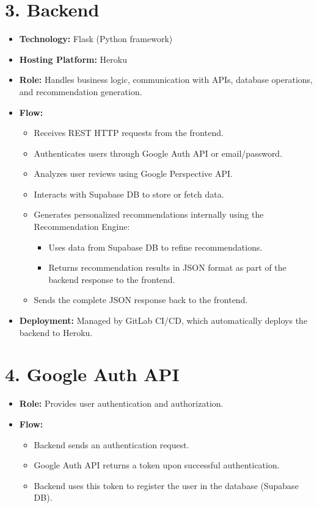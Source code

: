 \documentclass[a4paper,12pt]{article}
\begin{document}
\section*{3. Backend}
\begin{itemize}[leftmargin=*]
  \item \textbf{Technology:} Flask (Python framework)
  \item \textbf{Hosting Platform:} Heroku
  \item \textbf{Role:} Handles business logic, communication with APIs, database operations, and recommendation generation.
  \item \textbf{Flow:}
    \begin{itemize}
        \item Receives REST HTTP requests from the frontend.
        \item Authenticates users through Google Auth API or email/password.
        \item Analyzes user reviews using Google Perspective API.
        \item Interacts with Supabase DB to store or fetch data.
        \item Generates personalized recommendations internally using the Recommendation Engine:
        \begin{itemize}
            \item Uses data from Supabase DB to refine recommendations.
            \item Returns recommendation results in JSON format as part of the backend response to the frontend.
        \end{itemize}
        \item Sends the complete JSON response back to the frontend.
    \end{itemize}
  \item \textbf{Deployment:} Managed by GitLab CI/CD, which automatically deploys the backend to Heroku.
\end{itemize}

\section*{4. Google Auth API}
\begin{itemize}[leftmargin=*]
  \item \textbf{Role:} Provides user authentication and authorization.
  \item \textbf{Flow:}
    \begin{itemize}
        \item Backend sends an authentication request.
        \item Google Auth API returns a token upon successful authentication.
        \item Backend uses this token to register the user in the database (Supabase DB).
    \end{itemize}
\end{itemize}
\end{document}
